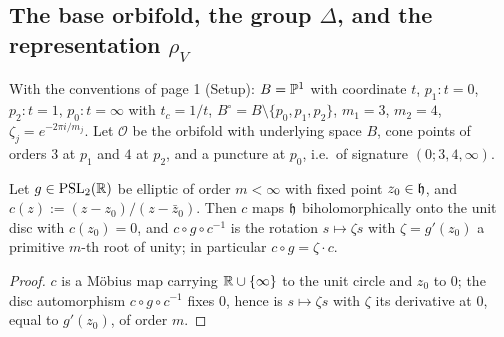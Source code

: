 \subsection{The base orbifold, the group $\Delta$, and the representation $\rho_V$}

With the conventions of page 1 (Setup): $B = \mathbb{P}^1$ with coordinate $t$, $p_1\colon t=0$, $p_2\colon t=1$, $p_0\colon t=\infty$ with $t_c = 1/t$, $B^\circ = B \setminus \{p_0,p_1,p_2\}$, $m_1=3$, $m_2=4$, $\zeta_j = e^{-2\pi i/m_j}$. Let $\mathcal O$ be the orbifold with underlying space $B$, cone points of orders $3$ at $p_1$ and $4$ at $p_2$, and a puncture at $p_0$, i.e.\ of signature $(0;3,4,\infty)$.

\begin{lemma}
Let $g \in \mathrm{PSL}_2(\mathbb{R})$ be elliptic of order $m < \infty$ with fixed point $z_0 \in \mathfrak{h}$, and $c(z) := (z-z_0)/(z-\bar z_0)$. Then $c$ maps $\mathfrak{h}$ biholomorphically onto the unit disc with $c(z_0) = 0$, and $c \circ g \circ c^{-1}$ is the rotation $s \mapsto \zeta s$ with $\zeta = g'(z_0)$ a primitive $m$-th root of unity; in particular $c \circ g = \zeta \cdot c$.
\end{lemma}

\begin{proof}
$c$ is a M\"obius map carrying $\mathbb{R} \cup \{\infty\}$ to the unit circle and $z_0$ to $0$; the disc automorphism $c\circ g \circ c^{-1}$ fixes $0$, hence is $s \mapsto \zeta s$ with $\zeta$ its derivative at $0$, equal to $g'(z_0)$, of order $m$.
\end{proof}

